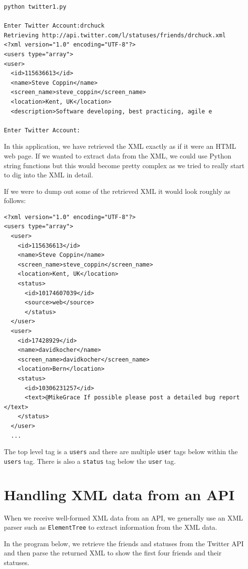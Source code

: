 \documentclass[10pt]{book}
\begin{document}
\beforeverb
\begin{verbatim}
python twitter1.py

Enter Twitter Account:drchuck
Retrieving http://api.twitter.com/l/statuses/friends/drchuck.xml
<?xml version="1.0" encoding="UTF-8"?>
<users type="array">
<user>
  <id>115636613</id>
  <name>Steve Coppin</name>
  <screen_name>steve_coppin</screen_name>
  <location>Kent, UK</location>
  <description>Software developing, best practicing, agile e

Enter Twitter Account:
\end{verbatim}
\afterverb
%
In this application, we have retrieved the XML exactly as if it were
an HTML web page.  If we wanted to extract data from the XML, we 
could use Python string functions but this would become pretty complex
as we tried to really start to dig into the XML in detail.

If we were to dump out some of the retrieved XML it would look roughly as follows:

\beforeverb
\begin{verbatim}
<?xml version="1.0" encoding="UTF-8"?>
<users type="array">
  <user>
    <id>115636613</id>
    <name>Steve Coppin</name>
    <screen_name>steve_coppin</screen_name>
    <location>Kent, UK</location>
    <status>
      <id>10174607039</id>
      <source>web</source>
      </status>
  </user>
  <user>
    <id>17428929</id>
    <name>davidkocher</name>
    <screen_name>davidkocher</screen_name>
    <location>Bern</location>
    <status>
      <id>10306231257</id>
      <text>@MikeGrace If possible please post a detailed bug report </text>
    </status>
  </user>
  ...
\end{verbatim}
\afterverb
%
The top level tag is a {\tt users} and there are multiple {\tt user} tags
below within the {\tt users} tag.   There is also a {\tt status} tag below
the {\tt user} tag.  

\section{Handling XML data from an API}

When we receive well-formed XML data from an API, we generally use
an XML parser such as {\tt ElementTree} to extract information from
the XML data.

In the program below, we retrieve the friends and statuses from
the Twitter API and then parse the returned XML to show the first
four friends and their statuses.
\end{document}
